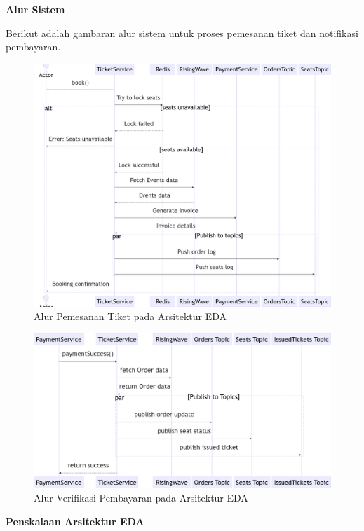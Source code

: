\textbf{Alur Sistem}

Berikut adalah gambaran alur sistem untuk proses pemesanan tiket dan notifikasi pembayaran.

\begin{figure}[htbp]
    \centering
    \includegraphics[width=1\textwidth]{resources/appendix/eda-book.png}
    \caption{Alur Pemesanan Tiket pada Arsitektur EDA}
    \label{fig:book-flow-eda}
\end{figure}

\begin{figure}[htbp]
    \centering
    \includegraphics[width=1\textwidth]{resources/appendix/eda-verify-payment.png}
    \caption{Alur Verifikasi Pembayaran pada Arsitektur EDA}
    \label{fig:payment-verify-flow-eda}
\end{figure}

\textbf{Penskalaan Arsitektur EDA}

